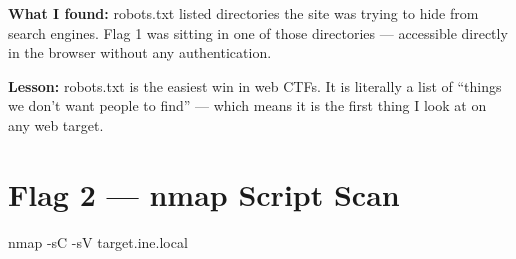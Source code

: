 \begin{notebox}

\textbf{What I found:} robots.txt listed directories the site was trying to
hide from search engines. Flag 1 was sitting in one of those directories ---
accessible directly in the browser without any authentication.


\begin{takebox}
\textbf{Lesson:} robots.txt is the easiest win in web CTFs. It is literally a
list of ``things we don't want people to find'' --- which means it is the first
thing I look at on any web target.
\end{takebox}

\section*{Flag 2 --- nmap Script Scan}

\end{notebox}

\begin{termbox}
nmap -sC -sV target.ine.local
\end{termbox}


